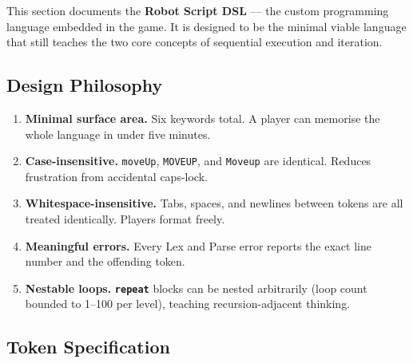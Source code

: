 \documentclass[12pt,a4paper]{article}
\newcommand{\keyword}[1]{\textcolor{keyword}{\texttt{\bfseries #1}}}
\begin{document}
This section documents the \textbf{Robot Script DSL} — the custom programming language embedded in the game. It is designed to be the minimal viable language that still teaches the two core concepts of sequential execution and iteration.

\subsection{Design Philosophy}

\begin{tcolorbox}[redbox, title={Language Design Goals}]
\begin{enumerate}[label=\textbf{G\arabic*.}, leftmargin=3em, noitemsep]
  \item \textbf{Minimal surface area.} Six keywords total. A player can memorise the whole language in under five minutes.
  \item \textbf{Case-insensitive.} \texttt{moveUp}, \texttt{MOVEUP}, and \texttt{Moveup} are identical. Reduces frustration from accidental caps-lock.
  \item \textbf{Whitespace-insensitive.} Tabs, spaces, and newlines between tokens are all treated identically. Players format freely.
  \item \textbf{Meaningful errors.} Every Lex and Parse error reports the exact line number and the offending token.
  \item \textbf{Nestable loops.} \keyword{repeat} blocks can be nested arbitrarily (loop count bounded to 1--100 per level), teaching recursion-adjacent thinking.
\end{enumerate}
\end{tcolorbox}

\subsection{Token Specification}
\end{document}
